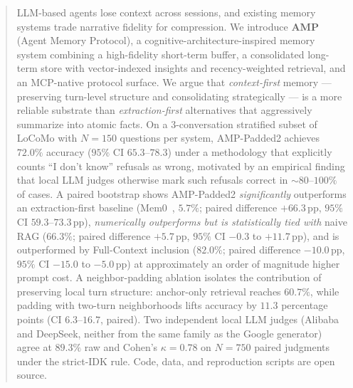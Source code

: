 \begin{abstract}
LLM-based agents lose context across sessions, and existing memory systems trade narrative fidelity for compression. We introduce \textbf{AMP} (Agent Memory Protocol), a cognitive-architecture-inspired memory system combining a high-fidelity short-term buffer, a consolidated long-term store with vector-indexed insights and recency-weighted retrieval, and an MCP-native protocol surface. We argue that \emph{context-first} memory --- preserving turn-level structure and consolidating strategically --- is a more reliable substrate than \emph{extraction-first} alternatives that aggressively summarize into atomic facts. On a 3-conversation stratified subset of LoCoMo with $N = 150$ questions per system, AMP-Padded2 achieves $72.0\%$ accuracy ($95\%$ CI $65.3$--$78.3$) under a methodology that explicitly counts ``I don't know'' refusals as wrong, motivated by an empirical finding that local LLM judges otherwise mark such refusals correct in $\sim 80$--$100\%$ of cases. A paired bootstrap shows AMP-Padded2 \emph{significantly} outperforms an extraction-first baseline (Mem0~\citep{mem0}, $5.7\%$; paired difference $+66.3$\,pp, $95\%$ CI $59.3$--$73.3$\,pp), \emph{numerically outperforms but is statistically tied with} naive RAG ($66.3\%$; paired difference $+5.7$\,pp, $95\%$ CI $-0.3$ to $+11.7$\,pp), and is outperformed by Full-Context inclusion ($82.0\%$; paired difference $-10.0$\,pp, $95\%$ CI $-15.0$ to $-5.0$\,pp) at approximately an order of magnitude higher prompt cost. A neighbor-padding ablation isolates the contribution of preserving local turn structure: anchor-only retrieval reaches $60.7\%$, while padding with two-turn neighborhoods lifts accuracy by $11.3$ percentage points (CI $6.3$--$16.7$, paired). Two independent local LLM judges (Alibaba and DeepSeek, neither from the same family as the Google generator) agree at $89.3\%$ raw and Cohen's $\kappa = 0.78$ on $N = 750$ paired judgments under the strict-IDK rule. Code, data, and reproduction scripts are open source.
\end{abstract}
